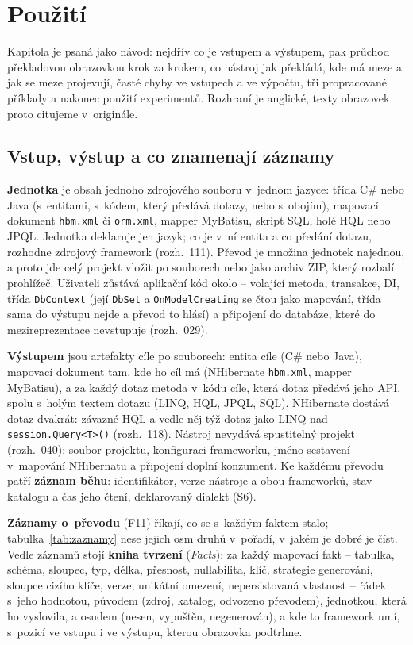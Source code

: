 \documentclass{article}
\begin{document}
\section{Použití}\label{sec:pouziti}

Kapitola je psaná jako návod: nejdřív co je vstupem a výstupem, pak průchod překladovou obrazovkou krok za krokem, co nástroj jak překládá, kde má meze a jak se meze projevují, časté chyby ve vstupech a ve výpočtu, tři propracované příklady a nakonec použití experimentů. Rozhraní je anglické, texty obrazovek proto citujeme v~originále.

\subsection{Vstup, výstup a co znamenají záznamy}

\textbf{Jednotka} je obsah jednoho zdrojového souboru v~jednom jazyce: třída C\# nebo Java (s~entitami, s~kódem, který předává dotazy, nebo s~obojím), mapovací dokument \texttt{hbm.xml} či \texttt{orm.xml}, mapper MyBatisu, skript SQL, holé HQL nebo JPQL. Jednotka deklaruje jen jazyk; co je v~ní entita a co předání dotazu, rozhodne zdrojový framework (rozh.~111). Převod je množina jednotek najednou, a proto jde celý projekt vložit po souborech nebo jako archiv ZIP, který rozbalí prohlížeč. Uživateli zůstává aplikační kód okolo -- volající metoda, transakce, DI, třída \texttt{DbContext} (její \texttt{DbSet} a \texttt{OnModelCreating} se čtou jako mapování, třída sama do výstupu nejde a převod to hlásí) a připojení do databáze, které do mezireprezentace nevstupuje (rozh.~029).

\textbf{Výstupem} jsou artefakty cíle po souborech: entita cíle (C\# nebo Java), mapovací dokument tam, kde ho cíl má (NHibernate \texttt{hbm.xml}, mapper MyBatisu), a za každý dotaz metoda v~kódu cíle, která dotaz předává jeho API, spolu s~holým textem dotazu (LINQ, HQL, JPQL, SQL). NHibernate dostává dotaz dvakrát: závazné HQL a vedle něj týž dotaz jako LINQ nad \texttt{session.Query<T>()} (rozh.~118). Nástroj nevydává spustitelný projekt (rozh.~040): soubor projektu, konfiguraci frameworku, jméno sestavení v~mapování NHibernatu a připojení doplní konzument. Ke každému převodu patří \textbf{záznam běhu}: identifikátor, verze nástroje a obou frameworků, stav katalogu a čas jeho čtení, deklarovaný dialekt (S6).

\textbf{Záznamy o~převodu} (F11) říkají, co se s~každým faktem stalo; tabulka~\ref{tab:zaznamy} nese jejich osm druhů v~pořadí, v~jakém je dobré je číst. Vedle záznamů stojí \textbf{kniha tvrzení} (\emph{Facts}): za každý mapovací fakt -- tabulka, schéma, sloupec, typ, délka, přesnost, nullabilita, klíč, strategie generování, sloupce cizího klíče, verze, unikátní omezení, nepersistovaná vlastnost -- řádek s~jeho hodnotou, původem (zdroj, katalog, odvozeno převodem), jednotkou, která ho vyslovila, a osudem (nesen, vypuštěn, negenerován), a kde to framework umí, s~pozicí ve vstupu i ve výstupu, kterou obrazovka podtrhne.
\end{document}

